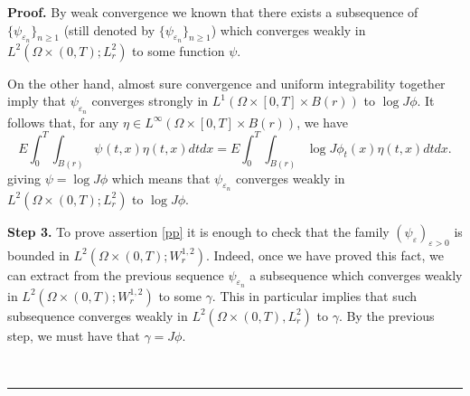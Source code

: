 \documentclass[a4paper,11pt]{article}
\newenvironment{proof}[1][Proof]{\textbf{#1.} }{\ \rule{0.5em}{0.5em}}
\newcommand{\eps}{\varepsilon}
\begin{document}
\begin{proof}
By weak convergence we known that there exists a subsequence
 of $\{\psi_{\eps_n}\}_{n\ge 1}$ (still denoted by $\{\psi_{\eps_n}\}_{n\ge 1}$)
  which  converges weakly in $L^{2}(\Omega \times
(0,T);L_{r}^{2})$ to some function $\psi $.

On the other hand,  almost sure convergence and uniform
integrability together imply that $\psi_{\eps_n}$ converges strongly
 in $L^1 ( \Omega
 \times [0,T] \times B(r))$ to $\log J \phi $. It follows that, for any
 $\eta \in L^{\infty}
( \Omega
 \times [0,T] \times B(r))$, we have
$$
E \int_{0}^{T}\int_{B(r)} \psi_{}(t,x) \eta(t,x) dt dx = E
\int_{0}^{T}\int_{B(r)}  \log J \phi_t(x) \eta(t,x) dt dx.
$$
giving $\psi = \log J \phi $ which means that $\psi_{\eps_n}$
converges weakly in $L^{2}(\Omega \times (0,T);L_{r}^{2})$ to $ \log
J\phi $.


\medskip \textbf{Step 3.} To prove  assertion
\eqref{pp} it is enough to check that the family $\left( \psi
_{\varepsilon }\right) _{\varepsilon >0}$ is bounded in
$L^{2}(\Omega \times (0,T);W_{r}^{1,2})$.
Indeed, once we have proved this fact, we can extract from
 the previous
sequence
 $\psi _{\varepsilon _{n}}$ a subsequence which converges
  weakly in $L^{2}(\Omega
\times (0,T);W_{r}^{1,2})$ to some $\gamma $. This in particular
implies that such subsequence  converges weakly in $L^{2}(\Omega
\times (0,T),L_{r}^{2})$ to  $\gamma $. By the previous step, we
must have that $\gamma = J \phi$.


\end{proof}
\end{document}
